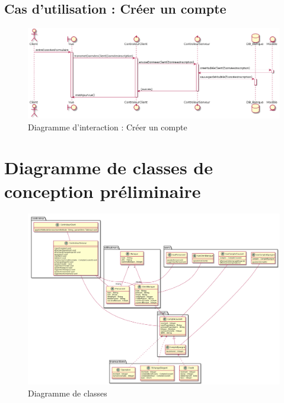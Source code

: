 \subsection{Cas d'utilisation : Créer un compte}
\begin{figure}[h!]
\begin{center}
   \caption{Diagramme d'interaction : Créer un compte}
   \includegraphics[scale=0.4]{images/SInscrire.png}
   \end{center}
\end{figure}
\newpage
\section{Diagramme de classes de conception préliminaire}
\begin{figure}[h!]
\begin{center}
   \caption{Diagramme de classes}
   \includegraphics[scale=0.3, angle=90]{images/diagrammeClasses.png}
   \end{center}
\end{figure}